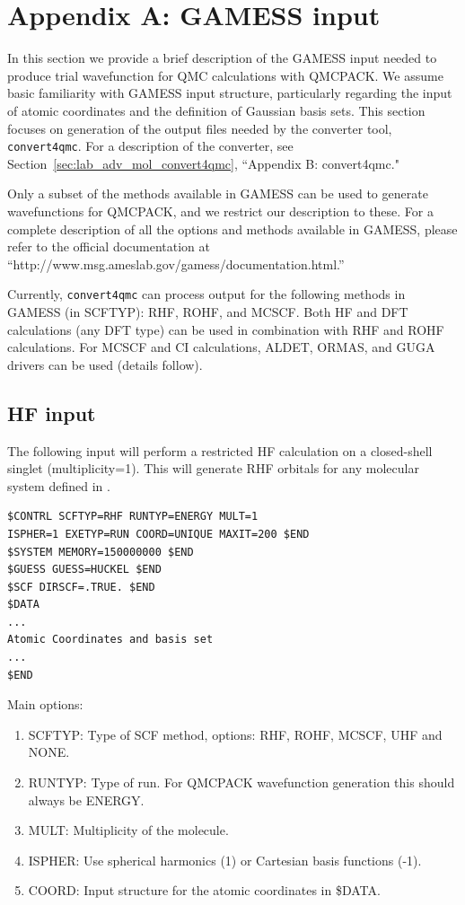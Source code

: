 {\newpage
\section{Appendix A: GAMESS input}\label{sec:lab_adv_mol_gamess}
In this section we provide a brief description of the GAMESS input needed to produce
trial wavefunction for QMC calculations with QMCPACK. We assume basic familiarity
with GAMESS input structure, particularly regarding the input of atomic coordinates and
the definition of Gaussian basis sets. This section focuses on generation of the output
files needed by the converter tool, \texttt{convert4qmc}. For a description of the converter, see Section~\ref{sec:lab_adv_mol_convert4qmc}, ``Appendix B: convert4qmc."

Only a subset of the methods available in GAMESS can be used to generate wavefunctions 
for QMCPACK, and we restrict our description to these.
For a complete description of all the options and methods available
in GAMESS, please refer to the official documentation at ``http://www.msg.ameslab.gov/gamess/documentation.html.”

Currently, \texttt{convert4qmc} can process output for the following methods in GAMESS (in
SCFTYP): RHF, ROHF, and MCSCF. Both HF and DFT calculations (any DFT
type) can be used in combination with RHF and ROHF calculations. For MCSCF and CI
calculations, ALDET, ORMAS, and GUGA drivers can be used (details follow).


\subsection{HF input}
The following input will perform a restricted HF calculation on a closed-shell singlet 
(multiplicity=1). This will generate RHF orbitals for any molecular system defined in 
.

\begin{lstlisting}[style=GAMESS]
$CONTRL SCFTYP=RHF RUNTYP=ENERGY MULT=1
ISPHER=1 EXETYP=RUN COORD=UNIQUE MAXIT=200 $END
$SYSTEM MEMORY=150000000 $END
$GUESS GUESS=HUCKEL $END
$SCF DIRSCF=.TRUE. $END
$DATA
...
Atomic Coordinates and basis set
...
$END
\end{lstlisting}

Main options:
\begin{enumerate}
  \item{SCFTYP: Type of SCF method, options: RHF, ROHF, MCSCF, UHF and NONE.}
  \item{RUNTYP: Type of run. For QMCPACK wavefunction generation this should always be ENERGY.}
  \item{MULT: Multiplicity of the molecule.}
  \item{ISPHER: Use spherical harmonics (1) or Cartesian basis functions (-1).}
  \item{COORD: Input structure for the atomic coordinates in \$DATA.}
\end{enumerate}


}
